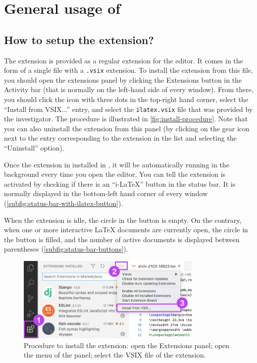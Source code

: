 \section{General usage of \iLaTeX{}}

\subsection{How to setup the \iLaTeX{} extension?}
The \iLaTeX{} extension is provided as a regular extension for the \vsc editor.
It comes in the form of a single file with a \texttt{.vsix} extension.
To install the extension from this file, you should open the extensions panel by clicking the Extensions button in the Activity bar (that is normally on the left-hand side of every \vsc window). From there, you should click the icon with three dots in the top-right hand corner, select the ``Install from VSIX...'' entry, and select the \texttt{ilatex.vsix} file that was provided by the investigator.
The procedure is illustrated in \autoref{fig:install-procedure}.
Note that you can also uninstall the extension from this panel (by clicking on the gear icon next to the entry corresponding to the \iLaTeX{} extension in the list and selecting the ``Uninstall'' option).

Once the \iLaTeX{} extension in installed in \vsc, it will be automatically running in the background every time you open the editor.
You can tell the \iLaTeX{} extension is activated by checking if there is an ``i-LaTeX'' button in the status bar.
It is normally displayed in the bottom-left hand corner of every \vsc window (\autoref{subfig:status-bar-with-ilatex-button}).

When the extension is idle, the circle in the button is empty.
On the contrary, when one or more interactive \LaTeX{} documents are currently open, the circle in the button is filled, and the number of active documents is displayed between parentheses (\autoref{subfig:status-bar-buttons}).

\begin{figure}[b!]
    \centering
    \includegraphics[width=0.8\textwidth]{img/installation-procedure.png}
    \caption{Procedure to install the \iLaTeX{} extension:  open the Extensions panel;  open the menu of the panel;  select the VSIX file of the extension.}
    \label{fig:install-procedure}
\end{figure}

